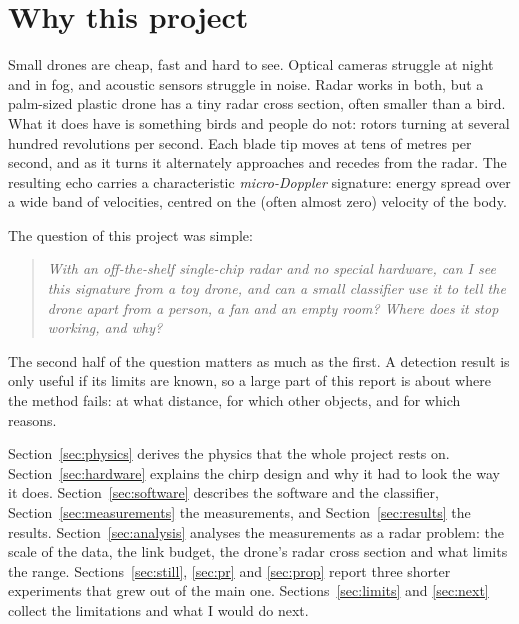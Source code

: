 \documentclass[11pt,a4paper]{article}
\begin{document}
{\setcounter{tocdepth}{1}\tableofcontents}
\newpage

\section{Why this project}

Small drones are cheap, fast and hard to see. Optical cameras struggle at night and in fog, and acoustic sensors struggle in noise. Radar works in both, but a palm-sized plastic drone has a tiny radar cross section, often smaller than a bird. What it does have is something birds and people do not: rotors turning at several hundred revolutions per second. Each blade tip moves at tens of metres per second, and as it turns it alternately approaches and recedes from the radar. The resulting echo carries a characteristic \emph{micro-Doppler} signature: energy spread over a wide band of velocities, centred on the (often almost zero) velocity of the body.

The question of this project was simple:
\begin{quote}
\emph{With an off-the-shelf single-chip radar and no special hardware, can I see this signature from a toy drone, and can a small classifier use it to tell the drone apart from a person, a fan and an empty room? Where does it stop working, and why?}
\end{quote}

The second half of the question matters as much as the first. A detection result is only useful if its limits are known, so a large part of this report is about where the method fails: at what distance, for which other objects, and for which reasons.

Section~\ref{sec:physics} derives the physics that the whole project rests on. Section~\ref{sec:hardware} explains the chirp design and why it had to look the way it does. Section~\ref{sec:software} describes the software and the classifier, Section~\ref{sec:measurements} the measurements, and Section~\ref{sec:results} the results. Section~\ref{sec:analysis} analyses the measurements as a radar problem: the scale of the data, the link budget, the drone's radar cross section and what limits the range. Sections~\ref{sec:still}, \ref{sec:pr} and \ref{sec:prop} report three shorter experiments that grew out of the main one. Sections~\ref{sec:limits} and \ref{sec:next} collect the limitations and what I would do next.
\end{document}
